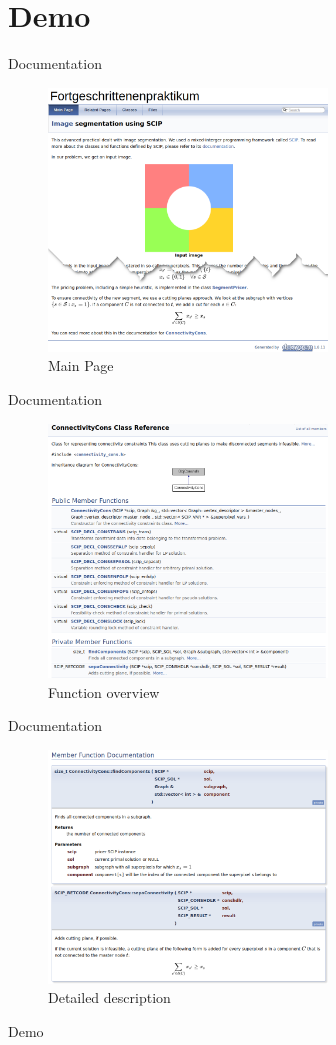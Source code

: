 \documentclass[fleqn]{beamer}
\begin{document}
    \section{Demo}
    \begin{frame}{Documentation}
        \begin{figure}
            \centering
            \includegraphics[width=20em]{mainpage}
            \caption{Main Page}
        \end{figure}
    \end{frame}

    \begin{frame}{Documentation}
        \begin{figure}
            \centering
            \includegraphics[width=20em]{overviewdoc}
            \caption{Function overview}
        \end{figure}
    \end{frame}

    \begin{frame}{Documentation}
        \begin{figure}
            \centering
            \includegraphics[width=20em]{detaildoc}
            \caption{Detailed description}
        \end{figure}
    \end{frame}

    \begin{frame}[standout]
        Demo
    \end{frame}
\end{document}
